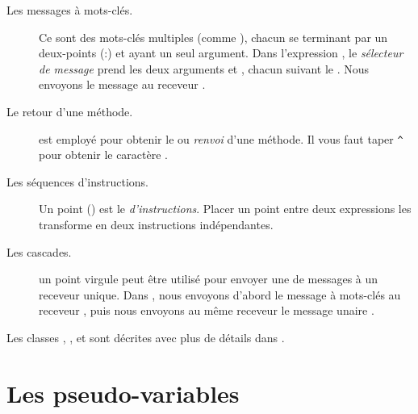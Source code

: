 \documentclass[a4paper,10pt,twoside]{book}
\begin{document}
\begin{description}
\item[Les messages \`{a} mots-cl\'{e}s.] Ce sont des mots-cl\'{e}s multiples (comme ), chacun se terminant par un deux-points (:) et ayant un seul argument. 
Dans l'expression , le \emph{sélecteur de message}  prend les deux arguments  et , chacun suivant le \lct{:}. Nous envoyons le message au receveur .

\item[Le retour d'une m\'{e}thode.] \ct{^} est employ\'{e} pour
  obtenir le  ou \emph{renvoi} d'une m\'{e}thode.  Il
  vous faut taper \verb|^| pour obtenir le caract\`{e}re \ct{^}.

\item[Les séquences d'instructions.]	Un point () est le
   \emph{d'instructions}. Placer un point entre deux expressions les transforme en deux instructions ind\'{e}pendantes.	

\item[Les cascades.] un point virgule peut \^{e}tre utilis\'{e} pour
  envoyer une  de messages \`{a} un receveur
  unique. Dans , nous envoyons
  d'abord le message à mots-cl\'{e}s  au receveur  , puis nous envoyons au m\^{e}me receveur le message unaire .

\end{description}

Les classes , ,  et  sont d\'{e}crites avec plus de d\'{e}tails dans .

\section{Les pseudo-variables}
\end{document}
